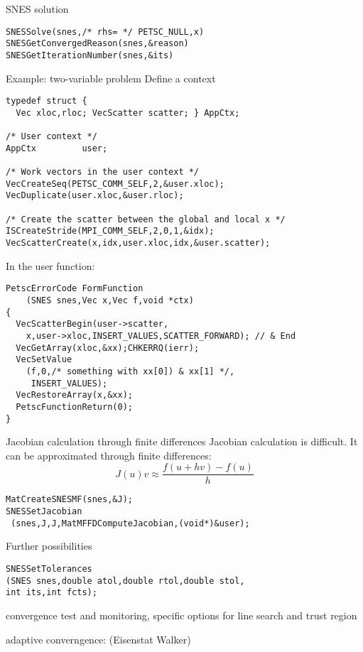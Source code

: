 \begin{numberedframe}{SNES solution}
\begin{lstlisting}
SNESSolve(snes,/* rhs= */ PETSC_NULL,x)
SNESGetConvergedReason(snes,&reason)
SNESGetIterationNumber(snes,&its)
\end{lstlisting}
\end{numberedframe}

\begin{numberedframe}{Example: two-variable problem}
Define a context
\begin{verbatim}
typedef struct {
  Vec xloc,rloc; VecScatter scatter; } AppCtx;

/* User context */
AppCtx         user;

/* Work vectors in the user context */
VecCreateSeq(PETSC_COMM_SELF,2,&user.xloc);
VecDuplicate(user.xloc,&user.rloc);

/* Create the scatter between the global and local x */
ISCreateStride(MPI_COMM_SELF,2,0,1,&idx);
VecScatterCreate(x,idx,user.xloc,idx,&user.scatter);
\end{verbatim}
\end{numberedframe}

\begin{numberedframe}
In the user function:
\begin{verbatim}
PetscErrorCode FormFunction
    (SNES snes,Vec x,Vec f,void *ctx)
{
  VecScatterBegin(user->scatter,
    x,user->xloc,INSERT_VALUES,SCATTER_FORWARD); // & End
  VecGetArray(xloc,&xx);CHKERRQ(ierr);
  VecSetValue
    (f,0,/* something with xx[0]) & xx[1] */,
     INSERT_VALUES);
  VecRestoreArray(x,&xx);
  PetscFunctionReturn(0);
}
\end{verbatim}
\end{numberedframe}

\begin{numberedframe}{Jacobian calculation through
    finite differences}
Jacobian calculation is difficult. It can be approximated through
finite differences:
\[ J(u)v \approx \frac{f(u+hv)-f(u)}{h} \]
\begin{verbatim}
MatCreateSNESMF(snes,&J);
SNESSetJacobian
 (snes,J,J,MatMFFDComputeJacobian,(void*)&user);
\end{verbatim}
\end{numberedframe}

\begin{numberedframe}{Further possibilities}

\begin{lstlisting}
SNESSetTolerances
(SNES snes,double atol,double rtol,double stol,
int its,int fcts);
\end{lstlisting}

convergence test and monitoring, specific options for line search and
trust region

adaptive converngence:  (Eisenstat Walker)
\end{numberedframe}


